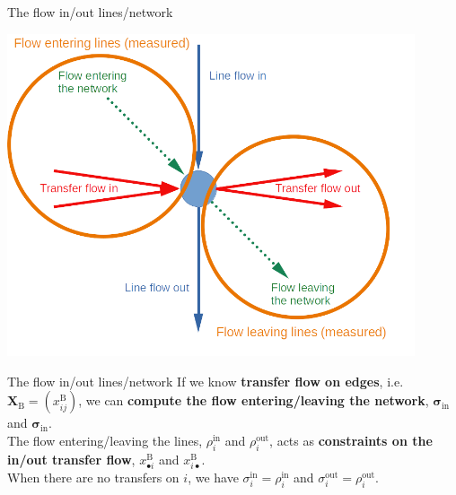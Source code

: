 \documentclass[10pt]{beamer}
\newcommand{\imp}[1]{\textbf{\color{cyan}#1}}
\begin{document}
	
	\begin{frame}{The flow in/out lines/network}
		\begin{center}
			\includegraphics[width=0.9\textwidth]{img/flow_measured.png}
		\end{center}
	\end{frame}
	
	
	\begin{frame}{The flow in/out lines/network}
		If we know \imp{transfer flow on edges}, i.e. $\mathbf{X}_\text{B} = (x^\text{B}_{ij})$, we can \imp{compute the flow entering/leaving the network}, $\bm{\sigma}_\text{in}$ and $\bm{\sigma}_\text{in}$. \\
		\vspace{0.4cm}
		The flow entering/leaving the lines, $\rho^\text{in}_i$ and $\rho^\text{out}_i$, acts as \imp{constraints on the in/out transfer flow}, $x^\text{B}_{\bullet i}$ and $x^\text{B}_{i \bullet}$.\\
		\vspace{0.4cm}
		When there are no transfers on $i$, we have $\sigma^\text{in}_i = \rho^\text{in}_i$ and  $\sigma^\text{out}_i = \rho^\text{out}_i$. \\
	\end{frame}
	
	
\end{document}

